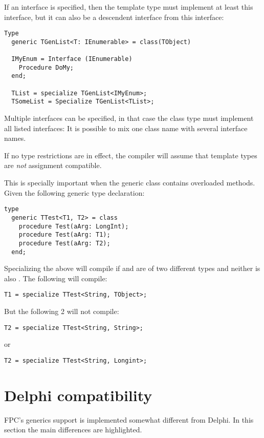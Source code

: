 If an interface is specified, then the template type must implement at least this interface, but it can also be a descendent interface from this interface:
\begin{verbatim}
Type
  generic TGenList<T: IEnumerable> = class(TObject)

  IMyEnum = Interface (IEnumerable)
    Procedure DoMy;
  end;
  
  TList = specialize TGenList<IMyEnum>;
  TSomeList = Specialize TGenList<TList>;
\end{verbatim}

Multiple interfaces can be specified, in that case the class type must implement all listed interfaces:
It is possible to mix one class name with several interface names.

If no type restrictions are in effect, the compiler will assume that template types are {\em not} assignment compatible.

This is specially important when the generic class contains overloaded methods. Given the following generic type declaration:
\begin{verbatim}
type
  generic TTest<T1, T2> = class
    procedure Test(aArg: LongInt);
    procedure Test(aArg: T1);
    procedure Test(aArg: T2);
  end;
\end{verbatim}
Specializing the above will compile if  and  are of two different types and neither is also . 
The following will compile:
\begin{verbatim}
T1 = specialize TTest<String, TObject>;
\end{verbatim}
But the following 2 will not compile: 
\begin{verbatim}
T2 = specialize TTest<String, String>;
\end{verbatim}
or
\begin{verbatim}
T2 = specialize TTest<String, Longint>;
\end{verbatim}

\section{Delphi compatibility}
FPC's generics support is implemented somewhat different from Delphi. In this section the main differences are highlighted. 

